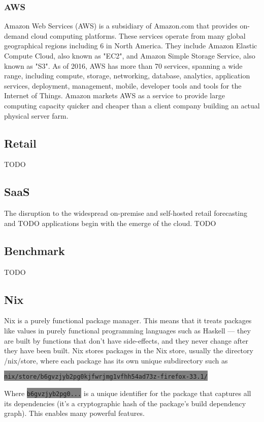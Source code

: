 \subsubsection{AWS}
Amazon Web Services (AWS) is a subsidiary of Amazon.com that provides on-demand
cloud computing platforms. These services operate from many global geographical
regions including 6 in North America. They include Amazon Elastic Compute
Cloud, also known as "EC2", and Amazon Simple Storage Service, also known as
"S3". As of 2016, AWS has more than 70 services, spanning a wide range,
including compute, storage, networking, database, analytics, application
services, deployment, management, mobile, developer tools and tools for the
Internet of Things. Amazon markets AWS as a service to provide large computing
capacity quicker and cheaper than a client company building an actual physical
server farm.

\subsection{Retail}
TODO

\subsection{SaaS}
The disruption to the widespread on-premise and self-hosted retail forecasting
and TODO applications begin with the emerge of the cloud.
TODO

\subsection{Benchmark}
TODO

\subsection{Nix}

Nix is a purely functional package manager. This means that it treats packages
like values in purely functional programming languages such as Haskell — they
are built by functions that don’t have side-effects, and they never change after
they have been built. Nix stores packages in the Nix store, usually the
directory /nix/store, where each package has its own unique subdirectory such as

\colorbox{Gray}{\lstinline{nix/store/b6gvzjyb2pg0kjfwrjmg1vfhh54ad73z-firefox-33.1/}}

Where \colorbox{Gray}{\lstinline{b6gvzjyb2pg0...}} is a unique identifier for the package that captures all its
dependencies (it’s a cryptographic hash of the package’s build dependency
graph). This enables many powerful features.

